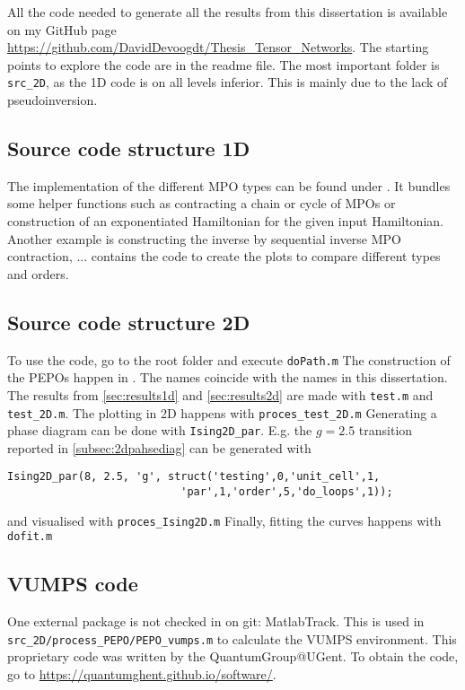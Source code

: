 
All the code needed to generate all the results from this dissertation is available on my GitHub page \url{https://github.com/DavidDevoogdt/Thesis_Tensor_Networks}. The starting points to explore the code are in the readme file. The most important folder is \verb#src_2D#, as the 1D code is on all levels inferior. This is mainly due to the lack of pseudoinversion.

\subsection{Source code structure 1D}

The implementation of the different \Gls{MPO} types can be found under . It bundles some helper functions such as contracting a chain or cycle of  \Glspl{MPO} or construction of an exponentiated Hamiltonian for the given input Hamiltonian. Another example is constructing the inverse by sequential inverse \Gls{MPO} contraction, ...   contains the code to create the plots to compare different types and orders.

\subsection{Source code structure 2D}

To use the code, go to the root folder and execute  \verb#doPath.m#
The construction of the \Glspl{PEPO} happen in . The names coincide with the names in this dissertation.
The results from \cref{sec:results1d} and \cref{sec:results2d} are made with  \verb#test.m# and \verb#test_2D.m#. The plotting in 2D happens with \verb#proces_test_2D.m#
Generating a phase diagram can be done with \verb#Ising2D_par#. E.g. the $g=2.5$ transition reported in \cref{subsec:2dpahsediag} can be generated with
\begin{verbatim}
Ising2D_par(8, 2.5, 'g', struct('testing',0,'unit_cell',1,
                           'par',1,'order',5,'do_loops',1));
\end{verbatim}
and visualised with \verb#proces_Ising2D.m# Finally, fitting the curves happens with \verb#dofit.m#

\subsection{ VUMPS code}
One external package is not checked in on git: MatlabTrack. This is used in  \verb#src_2D/process_PEPO/PEPO_vumps.m# to calculate the \Gls{VUMPS} environment. This proprietary code was written by the QuantumGroup@UGent. To obtain the code, go to \url{https://quantumghent.github.io/software/}.
